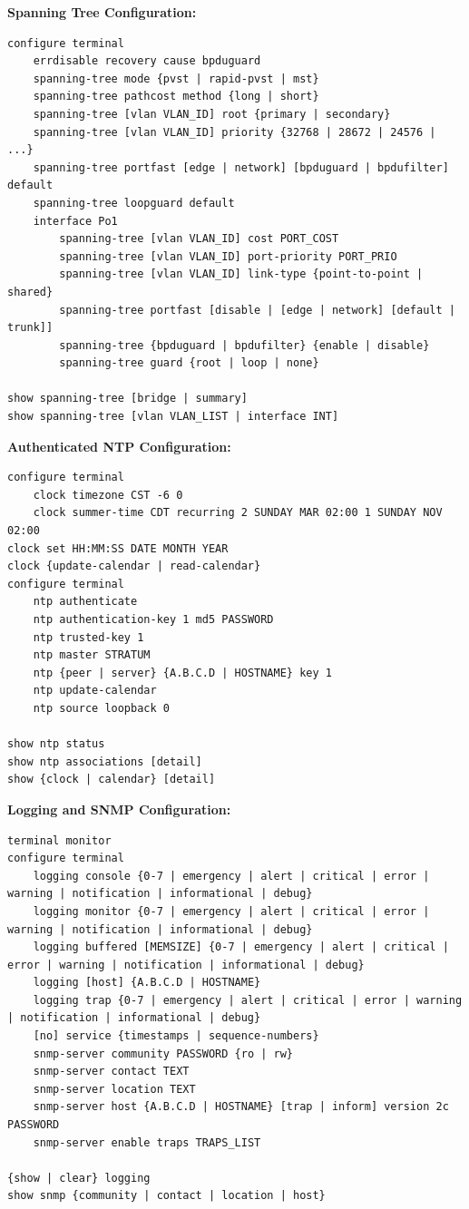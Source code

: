 \documentclass[12pt]{article}
\begin{document}
	\textbf{Spanning Tree Configuration:}
	\begin{lstlisting}
configure terminal
	errdisable recovery cause bpduguard
	spanning-tree mode {pvst | rapid-pvst | mst}
	spanning-tree pathcost method {long | short}
	spanning-tree [vlan VLAN_ID] root {primary | secondary}
	spanning-tree [vlan VLAN_ID] priority {32768 | 28672 | 24576 | ...}
	spanning-tree portfast [edge | network] [bpduguard | bpdufilter] default
	spanning-tree loopguard default
	interface Po1
		spanning-tree [vlan VLAN_ID] cost PORT_COST
		spanning-tree [vlan VLAN_ID] port-priority PORT_PRIO
		spanning-tree [vlan VLAN_ID] link-type {point-to-point | shared}
		spanning-tree portfast [disable | [edge | network] [default | trunk]]
		spanning-tree {bpduguard | bpdufilter} {enable | disable}
		spanning-tree guard {root | loop | none}

show spanning-tree [bridge | summary]
show spanning-tree [vlan VLAN_LIST | interface INT]
	\end{lstlisting}

	\textbf{Authenticated NTP Configuration:}
	\begin{lstlisting}
configure terminal
	clock timezone CST -6 0
	clock summer-time CDT recurring 2 SUNDAY MAR 02:00 1 SUNDAY NOV 02:00
clock set HH:MM:SS DATE MONTH YEAR
clock {update-calendar | read-calendar}
configure terminal
	ntp authenticate
	ntp authentication-key 1 md5 PASSWORD
	ntp trusted-key 1
	ntp master STRATUM
	ntp {peer | server} {A.B.C.D | HOSTNAME} key 1
	ntp update-calendar
	ntp source loopback 0

show ntp status
show ntp associations [detail]
show {clock | calendar} [detail]
	\end{lstlisting}

	\textbf{Logging and SNMP Configuration:}
	\begin{lstlisting}
terminal monitor
configure terminal
	logging console {0-7 | emergency | alert | critical | error | warning | notification | informational | debug}
	logging monitor {0-7 | emergency | alert | critical | error | warning | notification | informational | debug}
	logging buffered [MEMSIZE] {0-7 | emergency | alert | critical | error | warning | notification | informational | debug}
	logging [host] {A.B.C.D | HOSTNAME}
	logging trap {0-7 | emergency | alert | critical | error | warning | notification | informational | debug}
	[no] service {timestamps | sequence-numbers}
	snmp-server community PASSWORD {ro | rw}
	snmp-server contact TEXT
	snmp-server location TEXT
	snmp-server host {A.B.C.D | HOSTNAME} [trap | inform] version 2c PASSWORD
	snmp-server enable traps TRAPS_LIST

{show | clear} logging
show snmp {community | contact | location | host}
	\end{lstlisting}
\end{document}
